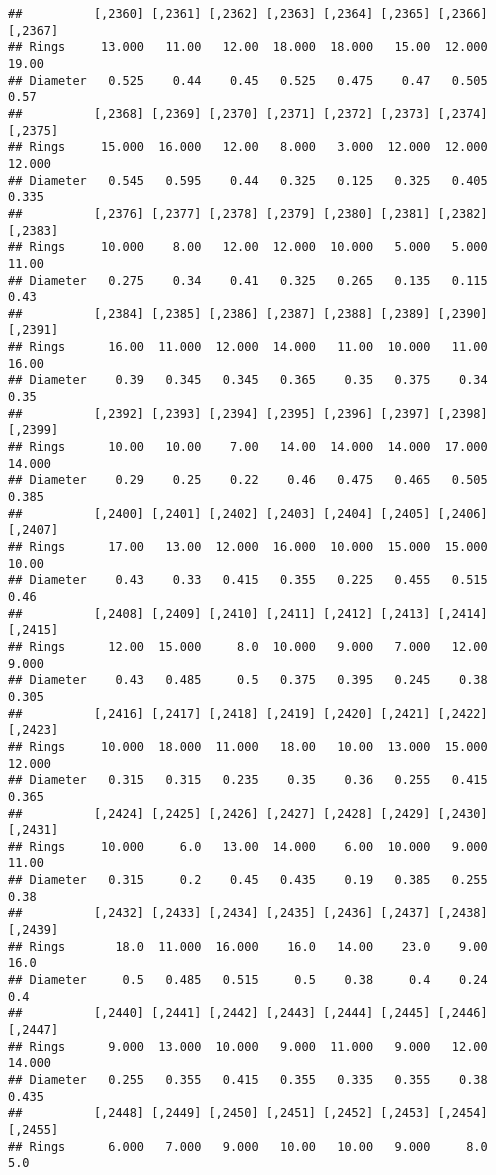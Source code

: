 \documentclass[
]{article}
\begin{document}
\begin{verbatim}
##          [,2360] [,2361] [,2362] [,2363] [,2364] [,2365] [,2366] [,2367]
## Rings     13.000   11.00   12.00  18.000  18.000   15.00  12.000   19.00
## Diameter   0.525    0.44    0.45   0.525   0.475    0.47   0.505    0.57
##          [,2368] [,2369] [,2370] [,2371] [,2372] [,2373] [,2374] [,2375]
## Rings     15.000  16.000   12.00   8.000   3.000  12.000  12.000  12.000
## Diameter   0.545   0.595    0.44   0.325   0.125   0.325   0.405   0.335
##          [,2376] [,2377] [,2378] [,2379] [,2380] [,2381] [,2382] [,2383]
## Rings     10.000    8.00   12.00  12.000  10.000   5.000   5.000   11.00
## Diameter   0.275    0.34    0.41   0.325   0.265   0.135   0.115    0.43
##          [,2384] [,2385] [,2386] [,2387] [,2388] [,2389] [,2390] [,2391]
## Rings      16.00  11.000  12.000  14.000   11.00  10.000   11.00   16.00
## Diameter    0.39   0.345   0.345   0.365    0.35   0.375    0.34    0.35
##          [,2392] [,2393] [,2394] [,2395] [,2396] [,2397] [,2398] [,2399]
## Rings      10.00   10.00    7.00   14.00  14.000  14.000  17.000  14.000
## Diameter    0.29    0.25    0.22    0.46   0.475   0.465   0.505   0.385
##          [,2400] [,2401] [,2402] [,2403] [,2404] [,2405] [,2406] [,2407]
## Rings      17.00   13.00  12.000  16.000  10.000  15.000  15.000   10.00
## Diameter    0.43    0.33   0.415   0.355   0.225   0.455   0.515    0.46
##          [,2408] [,2409] [,2410] [,2411] [,2412] [,2413] [,2414] [,2415]
## Rings      12.00  15.000     8.0  10.000   9.000   7.000   12.00   9.000
## Diameter    0.43   0.485     0.5   0.375   0.395   0.245    0.38   0.305
##          [,2416] [,2417] [,2418] [,2419] [,2420] [,2421] [,2422] [,2423]
## Rings     10.000  18.000  11.000   18.00   10.00  13.000  15.000  12.000
## Diameter   0.315   0.315   0.235    0.35    0.36   0.255   0.415   0.365
##          [,2424] [,2425] [,2426] [,2427] [,2428] [,2429] [,2430] [,2431]
## Rings     10.000     6.0   13.00  14.000    6.00  10.000   9.000   11.00
## Diameter   0.315     0.2    0.45   0.435    0.19   0.385   0.255    0.38
##          [,2432] [,2433] [,2434] [,2435] [,2436] [,2437] [,2438] [,2439]
## Rings       18.0  11.000  16.000    16.0   14.00    23.0    9.00    16.0
## Diameter     0.5   0.485   0.515     0.5    0.38     0.4    0.24     0.4
##          [,2440] [,2441] [,2442] [,2443] [,2444] [,2445] [,2446] [,2447]
## Rings      9.000  13.000  10.000   9.000  11.000   9.000   12.00  14.000
## Diameter   0.255   0.355   0.415   0.355   0.335   0.355    0.38   0.435
##          [,2448] [,2449] [,2450] [,2451] [,2452] [,2453] [,2454] [,2455]
## Rings      6.000   7.000   9.000   10.00   10.00   9.000     8.0     5.0

\end{verbatim}
\end{document}
